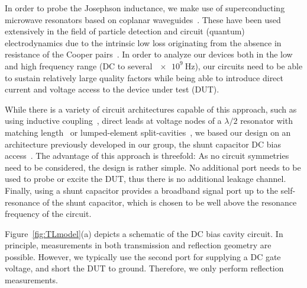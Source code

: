 In order to probe the Josephson inductance, we make use of superconducting microwave resonators based on coplanar waveguides~\cite{gopplCoplanarWaveguideResonators2008,zmuidzinasSuperconductingMicroresonatorsPhysics2012}.
%
These have been used extensively in the field of particle detection and circuit (quantum) electrodynamics due to the intrinsic low loss originating from the absence in resistance of the Cooper pairs~\cite{dayBroadbandSuperconductingDetector2003a,blaisCavityQuantumElectrodynamics2004c,clerkHybridQuantumSystems2020,blaisQuantumInformationProcessing2020}.
%
In order to analyze our devices both in the low and high frequency range (DC to several $\SI{e9}{\hertz}$), our circuits need to be able to sustain relatively large quality factors while being able to introduce direct current and voltage access to the device under test (DUT).

While there is a variety of circuit architectures capable of this approach, such as using inductive coupling~\cite{vissersFrequencytunableSuperconductingResonators2015b}, direct leads at voltage nodes of a $\lambda/2$ resonator with matching length~\cite{chenIntroductionDcBias2011a,liApplyingDirectCurrent2013} or lumped-element split-cavities~\cite{mahashabdeFastTunableHigh2020}, we based our design on an architecture previously developed in our group, the shunt capacitor DC bias access~\cite{bosmanBroadbandArchitectureGalvanically2015c}.
%
The advantage of this approach is threefold:
%
As no circuit symmetries need to be considered, the design is rather simple.
%
No additional port needs to be used to probe or excite the DUT, thus there is no additional leakage channel.
%
Finally, using a shunt capacitor provides a broadband signal port up to the self-resonance of the shunt capacitor, which is chosen to be well above the resonance frequency of the circuit.

Figure~\ref{fig:TLmodel}(a) depicts a schematic of the DC bias cavity circuit.
%
In principle, measurements in both transmission and reflection geometry are possible.
%
However, we typically use the second port for supplying a DC gate voltage, and short the DUT to ground.
%
Therefore, we only perform reflection measurements.

